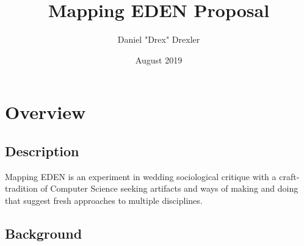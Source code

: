 \documentclass[a4paper,man,natbib]{apa6}
\title{Mapping EDEN Proposal}
\author{Daniel "Drex" Drexler}
\affiliation{Center for Science, Technology and Society at Drexel University}
\date{August 2019}
\begin{document}
   \maketitle

   \section*{Overview}
   \subsection*{Description}
   Mapping EDEN is an experiment in wedding sociological critique with a craft-tradition of Computer Science seeking artifacts and ways of making and doing that suggest fresh approaches to multiple disciplines.
   \subsection*{Background}

\end{document}
